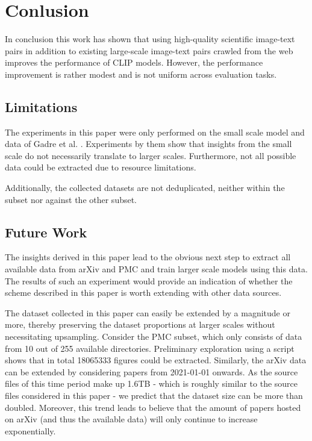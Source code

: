 \section{Conlusion}

In conclusion this work has shown that using high-quality scientific image-text pairs in addition to existing large-scale image-text pairs crawled from the web improves the performance of CLIP models. However, the performance improvement is rather modest and is not uniform across evaluation tasks.

\subsection{Limitations}

The experiments in this paper were only performed on the small scale model and data of Gadre et al. \cite{DBLP:journals/corr/abs-2304-14108}. Experiments by them show that insights from the small scale do not necessarily translate to larger scales. Furthermore, not all possible data could be extracted due to resource limitations.

Additionally, the collected datasets are not deduplicated, neither within the subset nor against the other subset.

\subsection{Future Work}

The insights derived in this paper lead to the obvious next step to extract all available data from arXiv and PMC and train larger scale models using this data. The results of such an experiment would provide an indication of whether the scheme described in this paper is worth extending with other data sources.

The dataset collected in this paper can easily be extended by a magnitude or more, thereby preserving the dataset proportions at larger scales without necessitating upsampling. Consider the PMC subset, which only consists of data from 10 out of 255 available directories. Preliminary exploration using a script shows that in total 18065333 figures could be extracted. Similarly, the arXiv data can be extended by considering papers from 2021-01-01 onwards. As the source files of this time period make up 1.6TB - which is roughly similar to the source files considered in this paper - we predict that the dataset size can be more than doubled. Moreover, this trend leads to believe that the amount of papers hosted on arXiv (and thus the available data) will only continue to increase exponentially.


